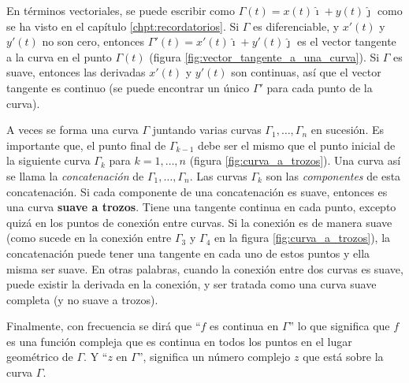 En términos vectoriales, se puede escribir como $\Gamma(t)=x(t)\hat{\imath} + y(t)\hat{\jmath}$ como se ha visto en el capítulo \ref{chpt:recordatorios}. Si $\Gamma$ es diferenciable, y $x'(t)$ y $y'(t)$ no son cero, entonces $\Gamma'(t)=x'(t)\hat{\imath}+y'(t)\hat{\jmath}$ es el vector tangente a la curva en el punto $\Gamma(t)$ (figura \ref{fig:vector_tangente_a_una_curva}). Si $\Gamma$ es suave, entonces las derivadas $x'(t)$ y $y'(t)$ son continuas, así que el vector tangente es continuo (se puede encontrar un único $\Gamma'$ para cada punto de la curva).



A veces se forma una curva $\Gamma$ juntando varias curvas $\Gamma_1,\dots, \Gamma_n$ en sucesión. Es importante que, el punto final de $\Gamma_{k-1}$ debe ser el mismo que el punto inicial de la siguiente curva $\Gamma_k$ para $k=1,\dots,n$ (figura \ref{fig:curva_a_trozos}). Una curva así se llama la \textit{concatenación} de $\Gamma_1,\dots,\Gamma_n$. Las curvas $\Gamma_k$ son las \textit{componentes} de esta concatenación. Si cada componente de una concatenación es suave, entonces es una curva \textbf{suave a trozos}. Tiene una tangente continua en cada punto, excepto quizá en los puntos de conexión entre curvas. Si la conexión es de manera suave (como sucede en la conexión entre $\Gamma_3$ y $\Gamma_4$ en la figura \ref{fig:curva_a_trozos}), la concatenación puede tener una tangente en cada uno de estos puntos y ella misma ser suave. En otras palabras, cuando la conexión entre dos curvas es suave, puede existir la derivada en la conexión, y ser tratada como una curva suave completa (y no suave a trozos).

Finalmente, con frecuencia se dirá que ``$f$ es continua en $\Gamma$'' lo que significa que $f$ es una función compleja que es continua en todos los puntos en el lugar geométrico de $\Gamma$. Y ``$z$ en $\Gamma$'', significa un número complejo $z$ que está sobre la curva $\Gamma$.

